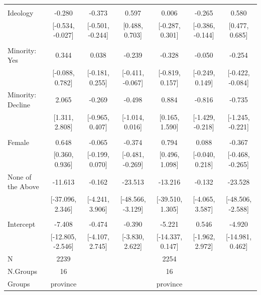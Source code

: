 \documentclass[
  10,
  letterpaper,
  DIV=11,
  numbers=noendperiod]{scrartcl}
\begin{document}
\begin{table}
\begin{tabular}[t]{lcccccc}
\addlinespace[0.3em]
\multicolumn{7}{l}{\cellcolor[HTML]{3498DB}{\textbf{Ideology}}}\\
\hspace{1em}Ideology & -0.280 & -0.373 & 0.597 & 0.006 & -0.265 & 0.580\\
\hspace{1em} & {}[-0.534, -0.027] & {}[-0.501, -0.244] & {}[0.488, 0.703] & {}[-0.287, 0.301] & {}[-0.386, -0.144] & {}[0.477, 0.685]\\
\addlinespace[0.3em]
\multicolumn{7}{l}{\cellcolor[HTML]{3498DB}{\textbf{Minority}}}\\
\hspace{1em}Minority: Yes & 0.344 & 0.038 & -0.239 & -0.328 & -0.050 & -0.254\\
\hspace{1em} & {}[-0.088, 0.782] & {}[-0.181, 0.255] & {}[-0.411, -0.067] & {}[-0.819, 0.157] & {}[-0.249, 0.149] & {}[-0.422, -0.084]\\
\hspace{1em}Minority: Decline & 2.065 & -0.269 & -0.498 & 0.884 & -0.816 & -0.735\\
\hspace{1em} & {}[1.311, 2.808] & {}[-0.965, 0.407] & {}[-1.014, 0.016] & {}[0.165, 1.590] & {}[-1.429, -0.218] & {}[-1.245, -0.221]\\
\addlinespace[0.3em]
\multicolumn{7}{l}{\cellcolor[HTML]{3498DB}{\textbf{Gender}}}\\
\hspace{1em}Female & 0.648 & -0.065 & -0.374 & 0.794 & 0.088 & -0.367\\
\hspace{1em} & {}[0.360, 0.936] & {}[-0.199, 0.070] & {}[-0.481, -0.269] & {}[0.496, 1.098] & {}[-0.040, 0.218] & {}[-0.468, -0.265]\\
\hspace{1em}None of the Above & -11.613 & -0.162 & -23.513 & -13.216 & -0.132 & -23.528\\
\hspace{1em} & {}[-37.096, 2.346] & {}[-4.241, 3.906] & {}[-48.566, -3.129] & {}[-39.510, 1.305] & {}[-4.065, 3.587] & {}[-48.506, -2.588]\\
\addlinespace[0.3em]
\multicolumn{7}{l}{\cellcolor[HTML]{3498DB}{\textbf{Intercept}}}\\
\hspace{1em}Intercept & -7.408 & -0.474 & -0.390 & -5.221 & 0.546 & -4.920\\
\hspace{1em} & {}[-12.805, -2.546] & {}[-4.107, 2.745] & {}[-3.830, 2.622] & {}[-14.337, 0.147] & {}[-1.962, 2.972] & {}[-14.981, 0.462]\\
\midrule
N & 2239 &  &  & 2254 &  & \\
N.Groups & 16 &  &  & 16 &  & \\
Groups & province &  &  & province &  & \\
\bottomrule
\end{tabular}
\end{table}
\end{document}
